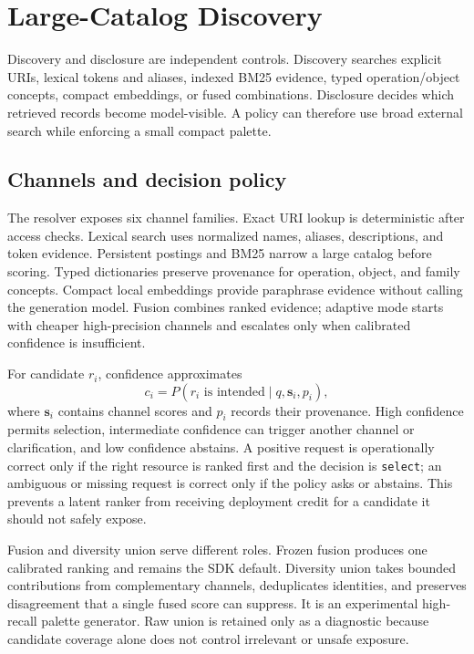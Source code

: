 \documentclass[11pt]{article}
\begin{document}
\section{Large-Catalog Discovery}

Discovery and disclosure are independent controls. Discovery searches
explicit URIs, lexical tokens and aliases, indexed BM25 evidence, typed
operation/object concepts, compact embeddings, or fused combinations.
Disclosure decides which retrieved records become model-visible. A policy can
therefore use broad external search while enforcing a small compact palette.

\subsection{Channels and decision policy}

The resolver exposes six channel families. Exact URI lookup is deterministic
after access checks. Lexical search uses normalized names, aliases, descriptions,
and token evidence. Persistent postings and BM25 narrow a large catalog before
scoring. Typed dictionaries preserve provenance for operation, object, and
family concepts. Compact local embeddings provide paraphrase evidence without
calling the generation model. Fusion combines ranked evidence; adaptive mode
starts with cheaper high-precision channels and escalates only when calibrated
confidence is insufficient.

For candidate $r_i$, confidence approximates
\[
c_i=P(r_i\text{ is intended}\mid q,\mathbf{s}_i,p_i),
\]
where $\mathbf{s}_i$ contains channel scores and $p_i$ records their provenance.
High confidence permits selection, intermediate confidence can trigger another
channel or clarification, and low confidence abstains. A positive request is
operationally correct only if the right resource is ranked first and the
decision is \texttt{select}; an ambiguous or missing request is correct only if
the policy asks or abstains. This prevents a latent ranker from receiving
deployment credit for a candidate it should not safely expose.

Fusion and diversity union serve different roles. Frozen fusion produces one
calibrated ranking and remains the SDK default. Diversity union takes bounded
contributions from complementary channels, deduplicates identities, and
preserves disagreement that a single fused score can suppress. It is an
experimental high-recall palette generator. Raw union is retained only as a
diagnostic because candidate coverage alone does not control irrelevant or
unsafe exposure.
\end{document}
